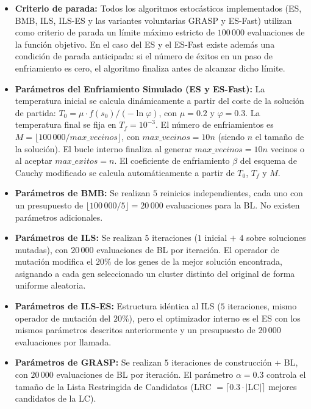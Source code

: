 \documentclass[a4paper,12pt]{article}%
\begin{document}
\begin{itemize}
	\item \textbf{Criterio de parada:} Todos los algoritmos estocásticos implementados (ES, BMB, ILS, ILS-ES y las variantes voluntarias GRASP y ES-Fast) utilizan como criterio de parada un límite máximo estricto de $100\,000$ evaluaciones de la función objetivo. En el caso del ES y el ES-Fast existe además una condición de parada anticipada: si el número de éxitos en un paso de enfriamiento es cero, el algoritmo finaliza antes de alcanzar dicho límite.
	
	\item \textbf{Parámetros del Enfriamiento Simulado (ES y ES-Fast):} La temperatura inicial se calcula dinámicamente a partir del coste de la solución de partida: $T_0 = \mu \cdot f(s_0) / (-\ln \varphi)$, con $\mu = 0.2$ y $\varphi = 0.3$. La temperatura final se fija en $T_f = 10^{-3}$. El número de enfriamientos es $M = \lfloor 100\,000 / \textit{max\_vecinos} \rfloor$, con $\textit{max\_vecinos} = 10n$ (siendo $n$ el tamaño de la solución). El bucle interno finaliza al generar	$\textit{max\_vecinos} = 10n$ vecinos o al aceptar $\textit{max\_exitos} = n$. El coeficiente de enfriamiento $\beta$ del esquema de Cauchy modificado se calcula automáticamente a partir de $T_0$, $T_f$ y $M$.
	
	\item \textbf{Parámetros de BMB:} Se realizan $5$ reinicios independientes, cada uno con un presupuesto de $\lfloor 100\,000 / 5 \rfloor = 20\,000$ evaluaciones para la BL. No existen parámetros adicionales.
	
	\item \textbf{Parámetros de ILS:} Se realizan $5$ iteraciones ($1$ inicial $+$ $4$ sobre soluciones mutadas), con $20\,000$ evaluaciones de BL por iteración. El operador de mutación modifica el $20\%$ de los genes de la mejor solución encontrada, asignando a cada gen seleccionado un cluster distinto del original de forma uniforme aleatoria.
		
	\item \textbf{Parámetros de ILS-ES:} Estructura idéntica al ILS ($5$ iteraciones, mismo operador de mutación del $20\%$), pero el optimizador interno es el ES con los mismos parámetros descritos anteriormente y un presupuesto de $20\,000$ evaluaciones por llamada.
	
	\item \textbf{Parámetros de GRASP:} Se realizan $5$ iteraciones de construcción + BL, con $20\,000$ evaluaciones de BL por iteración. El parámetro $\alpha = 0.3$ controla el tamaño de la Lista Restringida de Candidatos (LRC $= \lceil 0.3 \cdot |\text{LC}| \rceil$ mejores candidatos de la LC).
	

\end{itemize}
\end{document}
